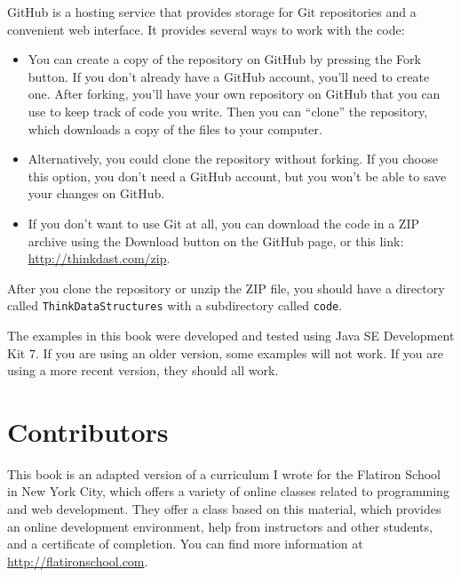 \documentclass[12pt]{book}
\theoremstyle{exercise}
\begin{document}

GitHub is a hosting service that provides storage for Git repositories
and a convenient web interface.  It provides several ways to work with
the code:

\begin{itemize}

\item You can create a copy of the repository on GitHub by pressing
  the {\sf Fork} button.  If you don't already have a GitHub account,
  you'll need to create one.  After forking, you'll have your own
  repository on GitHub that you can use to keep track of code you
  write.  Then you can ``clone'' the repository, which downloads a
  copy of the files to your computer.


\item Alternatively, you could clone the repository without forking.
  If you choose this option, you don't need a GitHub account, but you
  won't be able to save your changes on GitHub.

\item If you don't want to use Git at all, you can download the code
  in a ZIP archive using the {\sf Download} button on the GitHub
  page, or this link: \url{http://thinkdast.com/zip}.

\end{itemize}

After you clone the repository or unzip the ZIP file, you should have
a directory called {\tt ThinkDataStructures} with a subdirectory
called {\tt code}.

The examples in this book were developed and tested using Java SE
Development Kit 7.  If you are using an older version, some examples
will not work.  If you are using a more recent version, they should
all work.


\section*{Contributors}

This book is an adapted version of a curriculum I wrote for the
Flatiron School in New York City, which offers a variety of online
classes related to programming and web development.  They offer a
class based on this material, which provides an online development
environment, help from instructors and other students, and a
certificate of completion.  You can find more information at
\url{http://flatironschool.com}.
\end{document}
